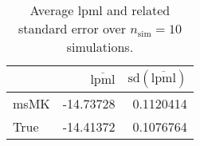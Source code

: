 \begin{table}[H]

\caption{Average lpml and related standard error over $n_{\text{sim}} = 10$ simulations.}
\centering
\begin{tabular}[t]{lrr}
\toprule
  & $\overbar{\text{lpml}}$ & $\text{sd}(\overbar{\text{lpml}})$\\
\midrule
msMK & -14.73728 & 0.1120414\\
True & -14.41372 & 0.1076764\\
\bottomrule
\end{tabular}
\end{table}